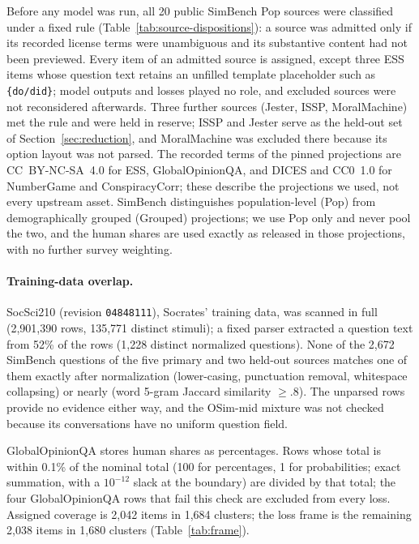 \documentclass[11pt]{article}
\begin{document}
Before any model was run, all 20 public SimBench Pop sources were classified
under a fixed rule (Table~\ref{tab:source-dispositions}): a source was admitted
only if its recorded license terms were unambiguous and its substantive
content had not been previewed. Every item of an admitted source is assigned,
except three ESS items whose question text retains an unfilled template
placeholder such as \texttt{\{do/did\}}; model outputs and losses played no
role, and excluded sources were not reconsidered afterwards. Three further sources (Jester, ISSP, MoralMachine) met the rule and were
held in reserve; ISSP and Jester serve as the held-out set of
Section~\ref{sec:reduction}, and MoralMachine was excluded there because its
option layout was not parsed. The recorded terms of the pinned projections are
CC~BY-NC-SA~4.0 for ESS, GlobalOpinionQA, and DICES and CC0~1.0 for NumberGame
and ConspiracyCorr; these describe the projections we used, not every upstream
asset. SimBench distinguishes population-level (Pop) from demographically
grouped (Grouped) projections; we use Pop only and never pool the two, and
the human shares are used exactly as released in those projections, with no
further survey weighting.

\paragraph{Training-data overlap.}
SocSci210 (revision \texttt{04848111}), Socrates' training data, was scanned
in full (2,901,390 rows, 135,771 distinct stimuli); a fixed parser extracted
a question text from 52\% of the rows (1,228 distinct normalized questions).
None of the 2,672 SimBench questions of the five primary and two held-out
sources matches one of them exactly after normalization (lower-casing,
punctuation removal, whitespace collapsing) or nearly (word 5-gram Jaccard
similarity $\ge .8$). The unparsed rows provide no evidence either way, and
the OSim-mid mixture was not checked because its conversations have no
uniform question field.

GlobalOpinionQA stores human shares as percentages. Rows whose total is within
0.1\% of the nominal total (100 for percentages, 1 for probabilities; exact
summation, with a $10^{-12}$ slack at the boundary) are divided by that total;
the four GlobalOpinionQA rows that fail this check are excluded from every loss. Assigned coverage is 2,042 items in 1,684 clusters;
the loss frame is the remaining 2,038 items in 1,680 clusters
(Table~\ref{tab:frame}).
\end{document}

